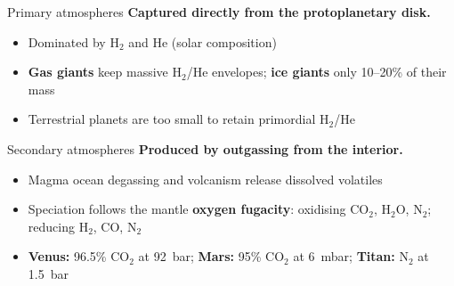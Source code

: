 \documentclass[aspectratio=169, 11pt]{beamer}
\begin{document}
\begin{frame}{Primary atmospheres}
  \textbf{Captured directly from the protoplanetary disk.}
  \vskip8pt
  \begin{itemize}
    \item Dominated by $\mathrm{H_2}$ and He (solar composition)
    \item \textbf{Gas giants} keep massive $\mathrm{H_2}$/He envelopes; \textbf{ice giants} only 10--20\% of their mass
    \item Terrestrial planets are too small to retain primordial $\mathrm{H_2}$/He
  \end{itemize}
\end{frame}

\begin{frame}
\end{frame}

\begin{frame}{Secondary atmospheres}
  \textbf{Produced by outgassing from the interior.}
  \vskip8pt
  \begin{itemize}
    \item Magma ocean degassing and volcanism release dissolved volatiles
    \item Speciation follows the mantle \textbf{oxygen fugacity}: oxidising $\mathrm{CO_2}$, $\mathrm{H_2O}$, $\mathrm{N_2}$; reducing $\mathrm{H_2}$, CO, $\mathrm{N_2}$
    \item \textbf{Venus:} 96.5\% $\mathrm{CO_2}$ at 92~bar; \textbf{Mars:} 95\% $\mathrm{CO_2}$ at 6~mbar; \textbf{Titan:} $\mathrm{N_2}$ at 1.5~bar
  \end{itemize}
\end{frame}

\begin{frame}
\end{frame}
\end{document}
